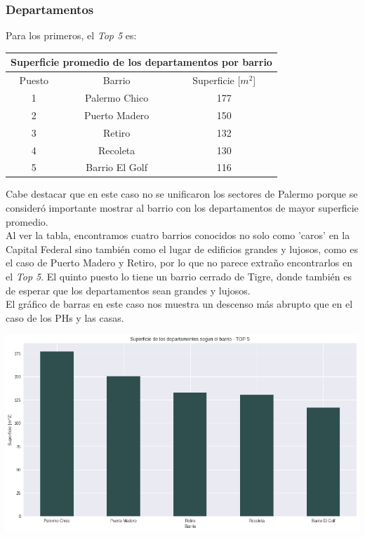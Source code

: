 \documentclass[a4paper, 10pt]{article}
\newcommand\tab[1][0.5cm]{\hspace*{#1}}
\begin{document}
				\subsubsection{Departamentos}
					Para los primeros, el \emph{Top 5} es:
					\begin{center}
						\begin{tabular}{ |c|c|c| }
							\hline
							\multicolumn{3}{|c|}{Superficie promedio de los departamentos por barrio}\\
							\hline
							\hline
							Puesto & Barrio & Superficie [$m^2$]\\
							\hline
							1 & Palermo Chico & 177 \\
							2 & Puerto Madero & 150 \\
							3 & Retiro & 132 \\
							4 & Recoleta & 130\\
							5 & Barrio El Golf & 116\\
							\hline
						\end{tabular}
					\end{center}
					\tab Cabe destacar que en este caso no se unificaron los sectores de Palermo porque se consideró importante
					mostrar al barrio con los departamentos de mayor superficie promedio. \\
					\tab Al ver la tabla, encontramos cuatro barrios conocidos no solo como 'caros' en la Capital Federal sino
					también como el lugar de edificios grandes y lujosos, como es el caso de Puerto Madero y Retiro, por lo que
					no parece extraño encontrarlos en el \emph{Top 5}. El quinto puesto lo tiene un barrio cerrado de Tigre, donde
					también es de esperar que los departamentos sean grandes y lujosos. \\
					\tab El gráfico de barras en este caso nos muestra un descenso más abrupto que en el caso de los PHs y las casas.
					\begin{center}
   		    				\includegraphics[width=\textwidth]{images/apartmentSurfaceTopBar}
				  	\end{center}
\end{document}
